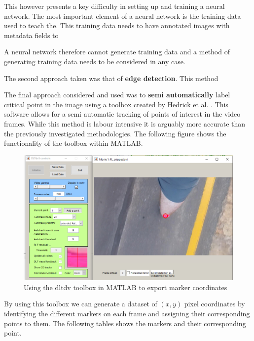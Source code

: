 This however presents a key difficulty in setting up and training a neural network. The most important element of a neural network is the training data used to teach the. This training data needs to have annotated images with metadata fields to

A neural network therefore cannot generate training data and a method of generating training data needs to be considered in any case.

The second approach taken was that of \textbf{edge detection}. This method 

The final approach considered and used was to \textbf{semi automatically} label critical point in the image using a toolbox created by Hedrick et al. \cite{hedrick2008software}. This software allows for a semi automatic tracking of points of interest in the video frames. While this method is labour intensive it is arguably more accurate than the previously investigated methodologies. The following figure shows the functionality of the toolbox within MATLAB.

\begin{figure}[!ht] 
\captionsetup{width=1\linewidth, font=small}  
\includegraphics[width=1\linewidth]{figures/toolbox.png}
\caption{Using the dltdv toolbox in MATLAB to export marker coordinates}
\label{fig:toolbox}
\end{figure}

By using this toolbox we can generate a dataset of $ (x,y) $ pixel coordinates by identifying the different markers on each frame and assigning their corresponding points to them. The following tables shows the markers and their corresponding point.

